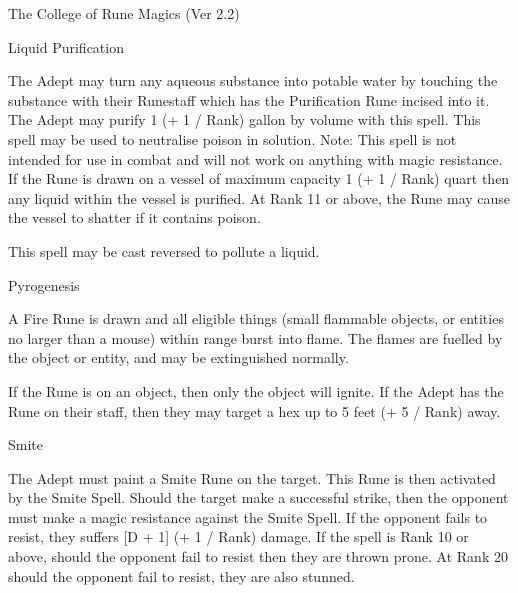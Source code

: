 \begin{Chapter}{The College of Rune Magics (Ver 2.2)}
\begin{spell}[G-5]{Liquid Purification}

\begin{effects}
The Adept may turn any aqueous substance into potable water by
touching the substance with their Runestaff which has the Purification
Rune incised into it. The Adept may purify 1 (+ 1 / Rank) gallon by
volume with this spell.  This spell may be used to neutralise poison
in solution. Note: This spell is not intended for use in combat and
will not work on anything with magic resistance. If the Rune is drawn
on a vessel of maximum capacity 1 (+ 1 / Rank) quart then any liquid
within the vessel is purified.  At Rank 11 or above, the Rune may
cause the vessel to shatter if it contains poison.

This spell may be cast reversed to pollute a liquid.
\end{effects}
\end{spell}

\begin{spell}[G-6]{Pyrogenesis}

\begin{effects}
A Fire Rune is drawn and all eligible things (small flammable objects,
or entities no larger than a mouse) within range burst into flame.
The flames are fuelled by the object or entity, and may be
extinguished normally.

If the Rune is on an object, then only the object will ignite. If the
Adept has the Rune on their staff, then they may target a hex up to 5
feet (+ 5 / Rank) away.
\end{effects}
\end{spell}

\begin{spell}[G-7]{Smite}

\begin{effects}
The Adept must paint a Smite Rune on the target.  This Rune is then
activated by the Smite Spell.  Should the target make a successful
strike, then the opponent must make a magic resistance against the
Smite Spell.  If the opponent fails to resist, they suffers [D + 1] (+
1 / Rank) damage. If the spell is Rank 10 or above, should the
opponent fail to resist then they are thrown prone.  At Rank 20 should
the opponent fail to resist, they are also stunned.


\end{effects}
\end{spell}
\end{Chapter}
